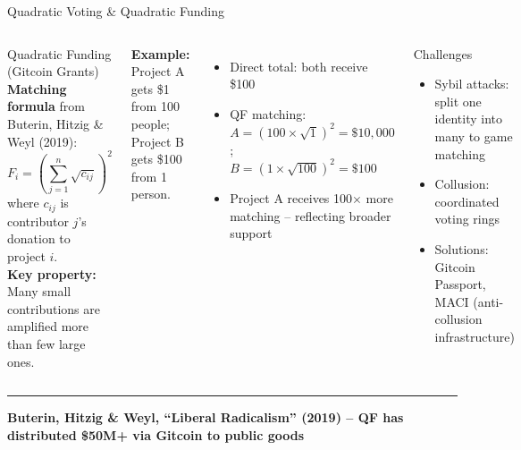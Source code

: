 \documentclass[8pt,aspectratio=169]{beamer}
\newcommand{\bottomnote}[1]{\vfill\vspace{-2mm}\textcolor{mllavender2}{\rule{\textwidth}{0.4pt}}\vspace{1mm}\footnotesize\textbf{#1}}
\begin{document}
\begin{frame}{Quadratic Voting \& Quadratic Funding}
\begin{columns}[T]
\begin{block}{Quadratic Funding (Gitcoin Grants)}
\footnotesize
\textbf{Matching formula} from Buterin, Hitzig \& Weyl (2019):
\[
F_i = \left(\sum_{j=1}^{n} \sqrt{c_{ij}}\right)^2
\]
where $c_{ij}$ is contributor $j$'s donation to project $i$.\\[1mm]
\textbf{Key property:} Many small contributions are amplified more than few large ones.
\end{block}
\vspace{1mm}
\footnotesize
\textbf{Example:} Project A gets \$1 from 100 people; Project B gets \$100 from 1 person.
\begin{itemize}
  \item Direct total: both receive \$100
  \item QF matching: $A = (100 \times \sqrt{1})^2 = \$10{,}000$;\\ $B = (1 \times \sqrt{100})^2 = \$100$
  \item Project A receives 100$\times$ more matching -- reflecting broader support
\end{itemize}
\vspace{1mm}
\begin{alertblock}{\footnotesize Challenges}
\footnotesize
\begin{itemize}
  \item Sybil attacks: split one identity into many to game matching
  \item Collusion: coordinated voting rings
  \item Solutions: Gitcoin Passport, MACI (anti-collusion infrastructure)
\end{itemize}
\end{alertblock}
\end{columns}
\bottomnote{Buterin, Hitzig \& Weyl, ``Liberal Radicalism'' (2019) -- QF has distributed \$50M+ via Gitcoin to public goods}
\end{frame}
\end{document}
